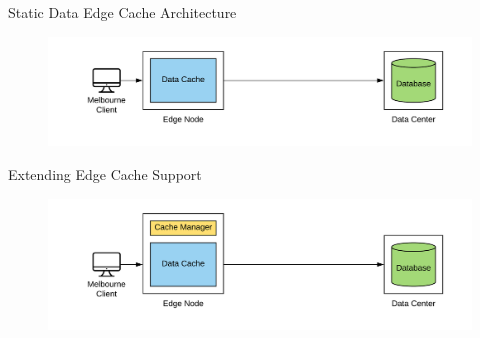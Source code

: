 \documentclass[10pt]{beamer}
\begin{document}

\begin{frame}{Static Data Edge Cache Architecture}
    \begin{figure}
        \center
        \hspace*{-1.5cm}
        \includegraphics[scale=0.17]{apollo_ec_dbl_0}
    \end{figure}
\end{frame}

\begin{frame}{Extending Edge Cache Support}
    \begin{figure}
        \center
        \hspace*{-1.5cm}
        \includegraphics[scale=0.17]{apollo_ec_dbl}
    \end{figure}
\end{frame}
\end{document}

